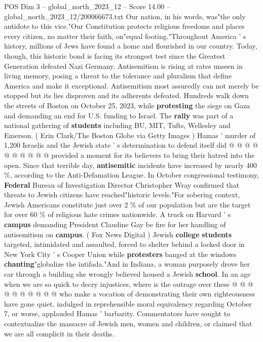 \begin{textsample}{POS Dim 3 – global\_north\_2023\_12 – Score 14.00 – global\_north\_2023\_12/200066673.txt}  \label{ex:f3_pos_227}
Our nation, in his words, was"the only antidote to this vice."Our Constitution protects religious freedoms and places every citizen, no matter their faith, on"equal footing."Throughout America ' s history, millions of Jews have found a home and flourished in our country.
Today, though, this historic bond is facing its strongest test since the Greatest Generation defeated Nazi Germany.
Antisemitism is rising at rates unseen in living memory, posing a threat to the tolerance and pluralism that define America and make it exceptional.
Antisemitism most assuredly can not merely be stopped but its lies disproven and its adherents defeated.
Hundreds walk down the streets of Boston on October 25, 2023, while \textbf{protesting} the siege on Gaza and demanding an end for U.S. funding to Israel.
The \textbf{rally} was part of a national gathering of \textbf{students} including BU, MIT, Tufts, Wellesley and Emerson. ( Erin Clark/The Boston Globe via Getty Images ) Hamas ' murder of 1,200 Israelis and the Jewish state ' s determination to defend itself did @ @ @ @ @ @ @ @ @ @ provided a moment for its believers to bring their hatred into the open.
Since that terrible day, \textbf{antisemitic} incidents have increased by nearly 400 \%, according to the Anti-Defamation League.
In October congressional testimony, \textbf{Federal} Bureau of Investigation Director Christopher Wray confirmed that threats to Jewish citizens have reached"historic levels."For sobering context, Jewish Americans constitute just over 2 \% of our population but are the target for over 60 \% of religious hate crimes nationwide.
A truck on Harvard ' s \textbf{campus} demanding President Claudine Gay be fire for her handling of antisemitism on \textbf{campus}. ( Fox News Digital ) Jewish \textbf{college} \textbf{students} targeted, intimidated and assaulted, forced to shelter behind a locked door in New York City ' s Cooper Union while \textbf{protesters} banged at the windows \textbf{chanting}"globalize the intifada."And in Indiana, a woman purposely drove her car through a building she wrongly believed housed a Jewish \textbf{school}.
In an age when we are so quick to decry injustices, where is the outrage over these @ @ @ @ @ @ @ @ @ @ who make a vocation of demonstrating their own righteousness have gone quiet, indulged in reprehensible moral equivalency regarding October 7, or worse, applauded Hamas ' barbarity.
Commentators have sought to contextualize the massacre of Jewish men, women and children, or claimed that we are all complicit in their deaths.

\end{textsample}
